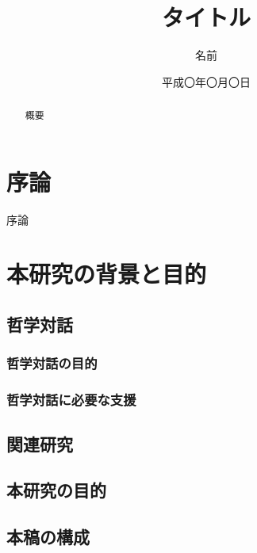 \documentclass[11pt, a4paper]{jreport} %
\title{タイトル}
\author{名前}
\date{平成〇年〇月〇日}
\begin{document}
\maketitle

\begin{abstract}
概要
\end{abstract}

\tableofcontents

\chapter{序論}

序論

\chapter{本研究の背景と目的}


\section{哲学対話}
\subsection{哲学対話の目的}

\subsection{哲学対話に必要な支援}

\section{関連研究}

\section{本研究の目的}
\label{sec:目的}

\section{本稿の構成}
\end{document}
